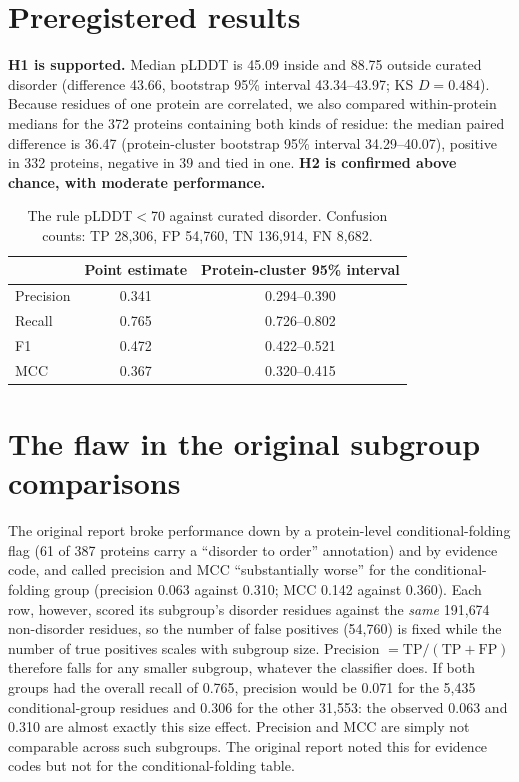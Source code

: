 \documentclass[11pt]{article}
\begin{document}
\section{Preregistered results}
\textbf{H1 is supported.} Median pLDDT is 45.09 inside and 88.75 outside curated disorder (difference 43.66, bootstrap
95\% interval 43.34--43.97; KS $D=0.484$). Because residues of one protein are correlated, we also compared
within-protein medians for the 372 proteins containing both kinds of residue: the median paired difference is 36.47
(protein-cluster bootstrap 95\% interval 34.29--40.07), positive in 332 proteins, negative in 39 and tied in one.
\textbf{H2 is confirmed above chance, with moderate performance.}
\begin{table}[h]
\centering\small
\begin{tabular}{lcc}
\toprule
 & Point estimate & Protein-cluster 95\% interval\\
\midrule
Precision & 0.341 & 0.294--0.390\\
Recall & 0.765 & 0.726--0.802\\
F1 & 0.472 & 0.422--0.521\\
MCC & 0.367 & 0.320--0.415\\
\bottomrule
\end{tabular}
\caption{The rule pLDDT$<$70 against curated disorder. Confusion counts: TP 28{,}306, FP 54{,}760, TN 136{,}914, FN 8{,}682.}
\end{table}

\section{The flaw in the original subgroup comparisons}
The original report broke performance down by a protein-level conditional-folding flag (61 of 387 proteins carry a
``disorder to order'' annotation) and by evidence code, and called precision and MCC ``substantially worse'' for the
conditional-folding group (precision 0.063 against 0.310; MCC 0.142 against 0.360). Each row, however, scored its
subgroup's disorder residues against the \emph{same} 191{,}674 non-disorder residues, so the number of false positives
(54{,}760) is fixed while the number of true positives scales with subgroup size. Precision
$=\mathrm{TP}/(\mathrm{TP}+\mathrm{FP})$ therefore falls for any smaller subgroup, whatever the classifier does.
If both groups had the overall recall of 0.765, precision would be 0.071 for the 5{,}435 conditional-group residues and
0.306 for the other 31{,}553: the observed 0.063 and 0.310 are almost exactly this size effect. Precision and MCC are
simply not comparable across such subgroups. The original report noted this for evidence codes but not for the
conditional-folding table.
\end{document}
